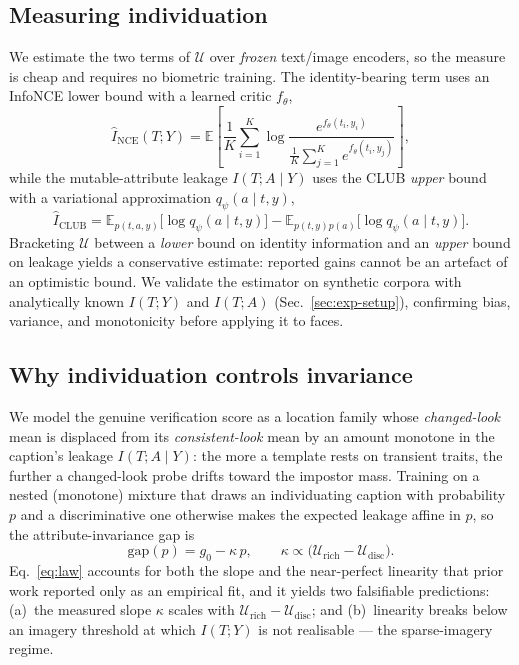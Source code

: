\documentclass[10pt,twocolumn,letterpaper]{article}
\newcommand{\U}{\mathcal{U}}
\begin{document}
\subsection{Measuring individuation}
\label{sec:measure}
We estimate the two terms of $\U$ over \emph{frozen} text/image encoders, so the measure is
cheap and requires no biometric training. The identity-bearing term uses an InfoNCE lower bound
with a learned critic $f_\theta$,
\begin{equation}
  \hat I_{\text{NCE}}(T;Y)=\mathbb{E}\!\left[\frac{1}{K}\sum_{i=1}^{K}
    \log\frac{e^{f_\theta(t_i,y_i)}}{\frac{1}{K}\sum_{j=1}^{K}e^{f_\theta(t_i,y_j)}}\right],
  \label{eq:nce}
\end{equation}
while the mutable-attribute leakage $I(T;A\mid Y)$ uses the CLUB \emph{upper} bound with a
variational approximation $q_\psi(a\mid t,y)$,
\begin{equation}
  \hat I_{\text{CLUB}}=\mathbb{E}_{p(t,a,y)}\!\big[\log q_\psi(a\mid t,y)\big]
    -\mathbb{E}_{p(t,y)p(a)}\!\big[\log q_\psi(a\mid t,y)\big].
  \label{eq:club}
\end{equation}
Bracketing $\U$ between a \emph{lower} bound on identity information and an \emph{upper} bound
on leakage yields a conservative estimate: reported gains cannot be an artefact of an optimistic
bound. We validate the estimator on synthetic corpora with analytically known $I(T;Y)$ and
$I(T;A)$ (Sec.~\ref{sec:exp-setup}), confirming bias, variance, and monotonicity before applying
it to faces.

\subsection{Why individuation controls invariance}
\label{sec:theory}
We model the genuine verification score as a location family whose \emph{changed-look} mean is
displaced from its \emph{consistent-look} mean by an amount monotone in the caption's leakage
$I(T;A\mid Y)$: the more a template rests on transient traits, the further a changed-look probe
drifts toward the impostor mass. Training on a nested (monotone) mixture that draws an
individuating caption with probability $p$ and a discriminative one otherwise makes the expected
leakage affine in $p$, so the attribute-invariance gap is
\begin{equation}
  \mathrm{gap}(p)=g_0-\kappa\,p,\qquad \kappa\propto\big(\U_{\text{rich}}-\U_{\text{disc}}\big).
  \label{eq:law}
\end{equation}
Eq.~\ref{eq:law} accounts for both the slope and the near-perfect linearity that prior work
reported only as an empirical fit, and it yields two falsifiable predictions:
(a)~the measured slope $\kappa$ scales with $\U_{\text{rich}}-\U_{\text{disc}}$; and (b)~linearity
breaks below an imagery threshold at which $I(T;Y)$ is not realisable --- the sparse-imagery
regime.
\end{document}

